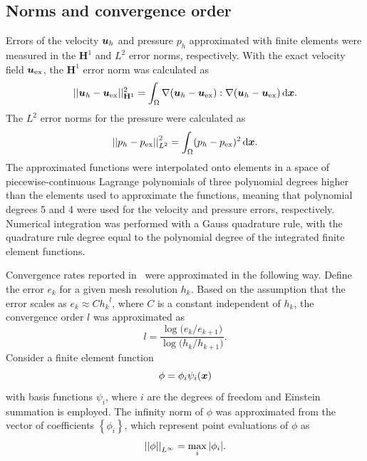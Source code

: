 \documentclass{WileyMSP-template}
\begin{document}
\subsection{Norms and convergence order}\label{subsec:norms_and_eoc}
Errors of the velocity $\bm{u}_h$ and pressure $p_h$ approximated with finite elements
were measured in the $\mathbf{H}^1$ and $L^2$ error norms, respectively.
With the exact velocity field $\bm{u}_{\mathrm{ex}}$, the $\mathbf{H}^1$
error norm was calculated as
\begin{equation*}
    \vert\vert\bm{u}_h - \bm{u}_{\mathrm{ex}}\vert\vert_{\mathbf{H}^1}^2
    = \int_{\Omega}\nabla(\bm{u}_h - \bm{u}_{\mathrm{ex}}) : \nabla(\bm{u}_h - \bm{u}_{\mathrm{ex}}) \, \mathrm d\bm{x}.
\end{equation*}
The $L^2$ error norms for the pressure were calculated as
\begin{equation*}
    { \vert\vert p_h - p_{\mathrm{ex}}\vert\vert}_{L^2}^2 = \int_{\Omega}(p_h - p_{\mathrm{ex}})^2 \, \mathrm d\bm{x}.
\end{equation*}
The approximated functions were interpolated onto elements in a space of piecewise-continuous
Lagrange polynomials of three polynomial degrees higher than the elements used to approximate
the functions, meaning that polynomial degrees 5 and 4 were used for the velocity and pressure
errors, respectively. Numerical integration was performed with a Gauss quadrature rule,
with the quadrature rule degree equal to the polynomial degree of the integrated
finite element functions. 

Convergence rates reported in~ were
approximated in the following way. Define the error $e_k$ for a given mesh
resolution $h_k$. Based on the assumption that the error scales as
$e_k \approx C{h_k}^l$, where $C$ is a constant independent of $h_k$,
the convergence order $l$ was approximated as
\begin{equation}
    l = \frac{\log{(e_k/e_{k+1}})}{\log{(h_k/h_{k+1}})}.
    \label{eq:convergence_order_estimate}
\end{equation}
Consider a finite element function 
\begin{equation*}
    \phi = \phi_i\psi_i(\bm{x})
\end{equation*}
with basis functions $\psi_i$, where $i$ are the degrees of freedom and Einstein
summation is employed.
The infinity norm of $\phi$ was approximated from the vector
of coefficients $\left\{\phi_i\right\}$, which represent point evaluations of $\phi$ as
\begin{equation*}
    {\vert\vert\phi\vert\vert}_{L^{\infty}} = \max_i{\vert \phi_i\vert}.
\end{equation*}
\end{document}

